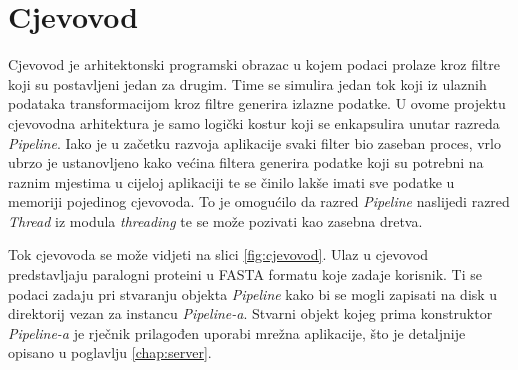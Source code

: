 \chapter{Cjevovod}
\label{chap:cjevovod}

Cjevovod je arhitektonski programski obrazac u kojem podaci prolaze kroz filtre
koji su postavljeni jedan za drugim. Time se simulira jedan tok koji iz ulaznih
podataka transformacijom kroz filtre generira izlazne podatke. U ovome projektu
cjevovodna arhitektura je samo logički kostur koji se enkapsulira unutar razreda
\emph{Pipeline}. Iako je u začetku razvoja aplikacije svaki filter bio zaseban
proces, vrlo ubrzo je ustanovljeno kako većina filtera generira podatke koji su
potrebni na raznim mjestima u cijeloj aplikaciji te se činilo lakše imati sve
podatke u memoriji pojedinog cjevovoda. To je omogućilo da razred
\emph{Pipeline} naslijedi razred \emph{Thread} iz modula \emph{threading} te se
može pozivati kao zasebna dretva.

Tok cjevovoda se može vidjeti na slici \ref{fig:cjevovod}. Ulaz u cjevovod
predstavljaju paralogni proteini u FASTA formatu koje zadaje korisnik. Ti se
podaci zadaju pri stvaranju objekta \emph{Pipeline} kako bi se mogli zapisati na
disk u direktorij vezan za instancu \emph{Pipeline-a}. Stvarni objekt kojeg
prima konstruktor \emph{Pipeline-a} je rječnik prilagođen uporabi mrežna
aplikacije, što je detaljnije opisano u poglavlju \ref{chap:server}.

